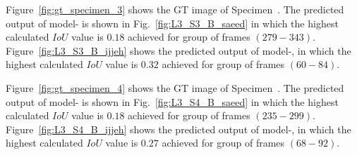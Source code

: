 Figure~\ref{fig:gt_specimen_3} shows the GT image of Specimen~.
The predicted output of model- is shown in Fig.~\ref{fig:L3_S3_B_saeed} in which the highest calculated \(IoU\) value is \(0.18\) achieved for group of frames \((279-343)\).
Figure~\ref{fig:L3_S3_B_ijjeh} shows the predicted output of model-, in which the highest calculated \(IoU\) value is \(0.32\) achieved for group of frames \((60-84)\).

Figure~\ref{fig:gt_specimen_4} shows the GT image of Specimen~.
The predicted output of model- is shown in Fig.~\ref{fig:L3_S4_B_saeed} in which the highest calculated \(IoU\) value is \(0.18\) achieved for group of frames \((235-299)\).
Figure~\ref{fig:L3_S4_B_ijjeh} shows the predicted output of model-, in which the highest calculated \(IoU\) value is \(0.27\) achieved for group of frames \((68-92)\).
